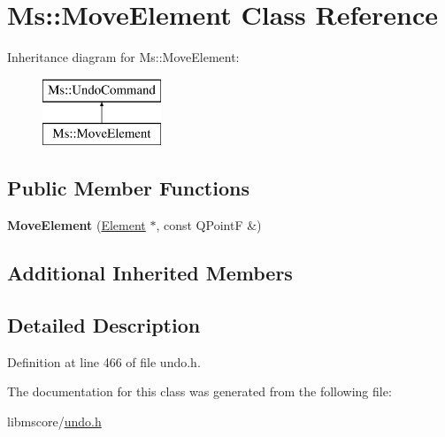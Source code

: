 \hypertarget{class_ms_1_1_move_element}{}\section{Ms\+:\+:Move\+Element Class Reference}
\label{class_ms_1_1_move_element}
Inheritance diagram for Ms\+:\+:Move\+Element\+:\begin{figure}[H]
\begin{center}
\leavevmode
\includegraphics[height=2.000000cm]{class_ms_1_1_move_element}
\end{center}
\end{figure}
\subsection*{Public Member Functions}
\begin{DoxyCompactItemize}
\item 
\mbox{\label{class_ms_1_1_move_element_a43b8a0958e4ecddb4cc973e2a3e5e856}} 
{\bfseries Move\+Element} (\hyperlink{class_ms_1_1_element}{Element} $\ast$, const Q\+PointF \&)
\end{DoxyCompactItemize}
\subsection*{Additional Inherited Members}


\subsection{Detailed Description}


Definition at line 466 of file undo.\+h.



The documentation for this class was generated from the following file\+:\begin{DoxyCompactItemize}
\item 
libmscore/\hyperlink{undo_8h}{undo.\+h}\end{DoxyCompactItemize}
